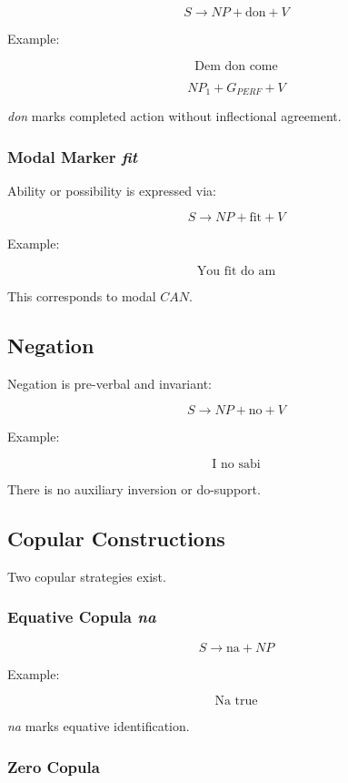 \documentclass[12pt]{article}
\begin{document}
\[
S \rightarrow NP + \text{don} + V
\]

Example:

\[
\text{Dem don come}
\]

\[
NP_1 + G_{PERF} + V
\]

\textit{don} marks completed action without inflectional agreement.

\subsubsection*{Modal Marker \textit{fit}}

Ability or possibility is expressed via:

\[
S \rightarrow NP + \text{fit} + V
\]

Example:

\[
\text{You fit do am}
\]

This corresponds to modal \( CAN \).

\subsection{Negation}

Negation is pre-verbal and invariant:

\[
S \rightarrow NP + \text{no} + V
\]

Example:

\[
\text{I no sabi}
\]

There is no auxiliary inversion or do-support.

\subsection{Copular Constructions}

Two copular strategies exist.

\subsubsection*{Equative Copula \textit{na}}

\[
S \rightarrow \text{na} + NP
\]

Example:

\[
\text{Na true}
\]

\textit{na} marks equative identification.

\subsubsection*{Zero Copula}
\end{document}
